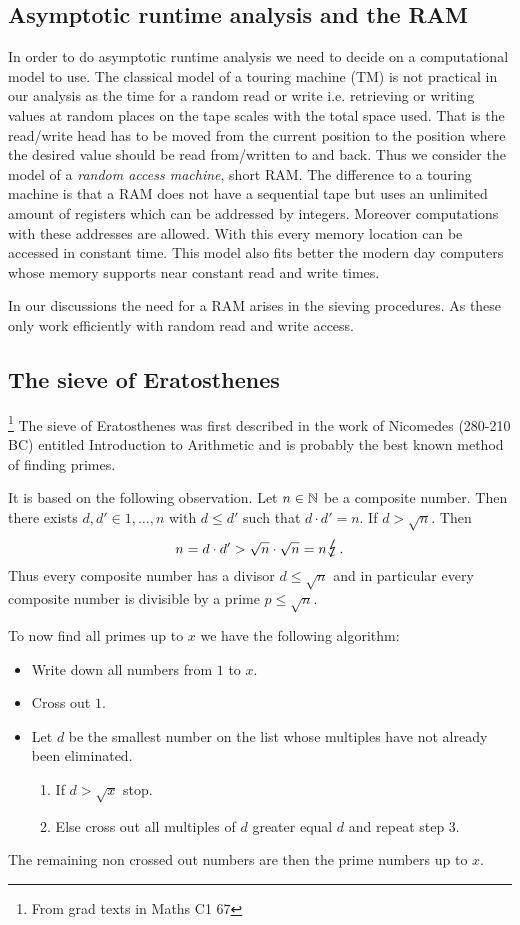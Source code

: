 \subsection{Asymptotic runtime analysis and the RAM}
In order to do asymptotic runtime analysis we need to decide on a computational model to use.
The classical model of a touring machine (TM) is not practical in our analysis as the time for a random read or write i.e.
retrieving or writing values at random places on the tape scales with the total space used.
That is the read/write head has to be moved from the current position to the position where the desired value should be read from/written to and back.
Thus we consider the model of a \emph{random access machine}, short RAM.
The difference to a touring machine is that a RAM does not have a sequential tape but uses
an unlimited amount of registers which can be addressed by integers. Moreover computations with these addresses are allowed.
With this every memory location can be accessed in constant time. This model also fits better the modern day computers
whose memory supports near constant read and write times.

In our discussions the need for a RAM arises in the sieving procedures. As these only work efficiently with random
read and write access.


\subsection{The sieve of Eratosthenes}\footnote{From grad texts in Maths C1 67}
The sieve of Eratosthenes was first described in the work of Nicomedes (280-210 BC) entitled Introduction to Arithmetic and is probably 
the best known method of finding primes.

It is based on the following observation. Let $n \in \mathbb{N}$ be a composite number. Then there exists $d, d' \in {1,\ldots,n}$ with $d \leq d'$ such that 
$d \cdot d' = n$. If $d > \sqrt{n}$. Then
\[
n = d \cdot  d' > \sqrt{n} \cdot \sqrt{n} = n \contra
.\] 
Thus every composite number has a divisor $d \leq \sqrt{n}$ and in particular every composite number is divisible by a prime $p \leq \sqrt{n}$.

To now find all primes up to $x$ we have the following algorithm:

\begin{itemize}
	\item Write down all numbers from $1$ to $x$.
	\item Cross out $1$.
	\item Let $d$ be the smallest number on the list whose multiples have not already been eliminated.
		 \begin{enumerate}
			\item If $d > \sqrt{x}$ stop.
			\item Else cross out all multiples of $d$ greater equal $d$ and repeat step 3.
		\end{enumerate}
\end{itemize}
The remaining non crossed out numbers are then the prime numbers up to  $x$.

